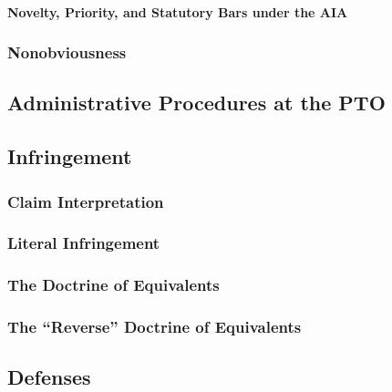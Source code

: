 \paragraph{Novelty, Priority, and Statutory Bars under the AIA}




\subsubsection{Nonobviousness}



\subsection{Administrative Procedures at the PTO}


\subsection{Infringement}

\subsubsection{Claim Interpretation}


\subsubsection{Literal Infringement}


\subsubsection{The Doctrine of Equivalents}



\subsubsection{The ``Reverse'' Doctrine of Equivalents}


\subsection{Defenses}

